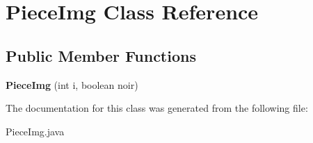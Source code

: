 \hypertarget{class_piece_img}{}\section{Piece\+Img Class Reference}
\label{class_piece_img}
\subsection*{Public Member Functions}
\begin{DoxyCompactItemize}
\item 
{\bfseries Piece\+Img} (int i, boolean noir)\hypertarget{class_piece_img_a774ff3b1c3d8ffaf3ade7299b3229054}{}\label{class_piece_img_a774ff3b1c3d8ffaf3ade7299b3229054}

\end{DoxyCompactItemize}


The documentation for this class was generated from the following file\+:\begin{DoxyCompactItemize}
\item 
Piece\+Img.\+java\end{DoxyCompactItemize}
